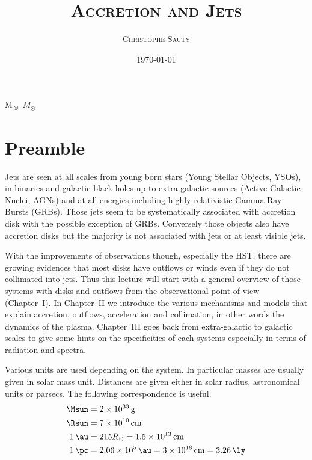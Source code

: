 \documentclass[10pt,a4paper,english]{article}
\title{\textsc{Accretion and Jets}}
\author{\textsc{Christophe Sauty}}
\date{\today}
\begin{document}

\maketitle

\begin{center}
    \ifxetex
        {\LatinModern M\textsubscript{\NotoSans ☺}}
    \else
        $M_{\odot}$ %
    \fi
\end{center}

\section*{Preamble}

Jets are seen at all scales from young born stars (Young Stellar Objects,
YSOs), in binaries and galactic black holes up to extra-galactic sources (Active
Galactic Nuclei, AGNs) and at all energies including highly relativistic Gamma
Ray Bursts (GRBs). Those jets seem to be systematically associated with
accretion disk with the possible exception of GRBs. Conversely those objects
also have accretion disks but the majority is not associated with jets or at
least visible jets.

With the improvements of observations though, especially the HST, there are
growing evidences that most disks have outflows or winds even if they do not
collimated into jets. Thus this lecture will start with a general overview of
those systems with disks and outflows from the observational point of view
(Chapter~I). In Chapter~II we introduce the various mechanisms and models that
explain accretion, outflows, acceleration and collimation, in other words the
dynamics of the plasma. Chapter~III goes back from extra-galactic to galactic
scales to give some hints on the specificities of each systems especially in
terms of radiation and spectra.

Various units are used depending on the system. In particular masses are
usually given in solar mass unit. Distances are given either in solar radius,
astronomical units or parsecs. The following correspondence is useful.
\begin{align*}
    \si{\Msun} &= \SI{2e33}{\gram} \\
    \si{\Rsun} &= \SI{7e10}{\cm} \\
    \SI{1}{\au} &= 215 R_\odot = \SI{1.5e13}{\cm} \\
    \SI{1}{\pc} &= \SI{2.06e5}{\au} = \SI{3e18}{\cm} = \SI{3.26}{\ly}
\end{align*}
\end{document}
